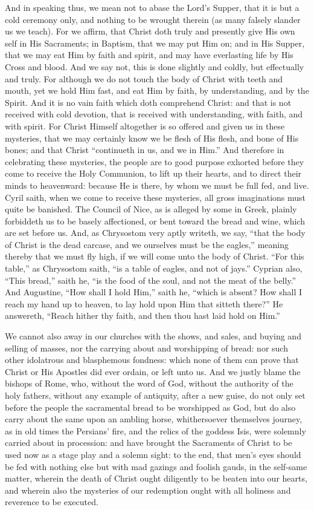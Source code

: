 And
in speaking thus, we mean not to abase the Lord’s Supper, that
it is but a cold ceremony only, and nothing to be wrought therein (as
many falsely slander us we teach). For we affirm, that Christ
doth truly and presently give His own self in His Sacraments; in Baptism,
that we may put Him on; and in His Supper, that we may eat Him by faith
and spirit, and may have everlasting life by His Cross and blood.
And we say not, this is done slightly and coldly, but effectually and
truly. For although we do not touch the body of Christ with teeth
and mouth, yet we hold Him fast, and eat Him by faith, by understanding,
and by the Spirit. And it is no vain faith which doth comprehend
Christ: and that is not received with cold devotion, that is received
with understanding, with faith, and with spirit. For Christ Himself
altogether is so offered and given us in these mysteries, that we may
certainly know we be flesh of His flesh, and bone of His bones; and
that Christ “continueth in us, and we in Him.” And
therefore in celebrating these mysteries, the people are to good purpose
exhorted before they come to receive the Holy Communion, to lift up
their hearts, and to direct their minds to heavenward: because He is
there, by whom we must be full fed, and live. Cyril saith, when
we come to receive these mysteries,
all gross imaginations must quite be banished. The Council of
Nice, as is alleged by some in Greek, plainly forbiddeth us to be basely
affectioned, or bent toward the bread and wine, which are set before
us. And, as Chrysostom very aptly writeth, we say, “that
the body of Christ is the dead carcase, and we ourselves must be the
eagles,” meaning thereby that we must fly high, if we will come
unto the body of Christ. “For this table,” as Chrysostom
saith, “is a table of eagles, and not of jays.” Cyprian
also, “This bread,” saith he, “is the food of the
soul, and not the meat of the belly.” And Augustine, “How
shall I hold Him,” saith he, “which is absent? How
shall I reach my hand up to heaven, to lay hold upon Him that sitteth
there?” He answereth, “Reach hither thy faith, and
then thou hast laid hold on Him.”

We cannot also away in our churches with the shows, and sales, and
buying and selling of masses, nor the carrying about and worshipping
of bread: nor such other idolatrous and blasphemous fondness: which
none of them can prove that Christ or His Apostles did ever ordain,
or left unto us. And we justly blame the bishops of Rome, who,
without the word of God, without the authority of the holy fathers,
without any example of
antiquity, after a new guise, do not only set before the people the
sacramental bread to be worshipped as God, but do also carry about the
same upon an ambling horse, whithersoever themselves journey, as in
old times the Persians’ fire, and the relics of the goddess Isis,
were solemnly carried about in procession: and have brought the Sacraments
of Christ to be used now as a stage play and a solemn sight: to the
end, that men’s eyes should be fed with nothing else but with
mad gazings and foolish gauds, in the self-same matter, wherein the
death of Christ ought diligently to be beaten into our hearts, and wherein
also the mysteries of our redemption ought with all holiness and reverence
to be executed.

